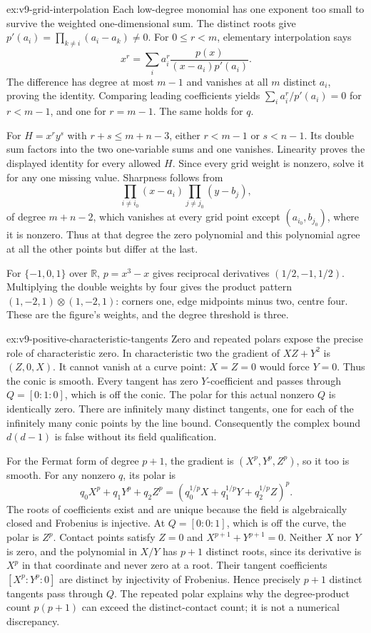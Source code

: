 \begin{solution}{ex:v9-grid-interpolation}
\idea Each low-degree monomial has one exponent too small to survive the weighted one-dimensional sum.
\writeup The distinct roots give $p'(a_i)=\prod_{k\ne i}(a_i-a_k)\ne0$. For $0\le r<m$, elementary interpolation says
\[
x^r=\sum_i a_i^r\frac{p(x)}{(x-a_i)p'(a_i)}.
\]
The difference has degree at most $m-1$ and vanishes at all $m$ distinct $a_i$, proving the identity. Comparing leading coefficients yields $\sum_i a_i^r/p'(a_i)=0$ for $r<m-1$, and one for $r=m-1$. The same holds for $q$.

For $H=x^ry^s$ with $r+s\le m+n-3$, either $r<m-1$ or $s<n-1$. Its double sum factors into the two one-variable sums and one vanishes. Linearity proves the displayed identity for every allowed $H$. Since every grid weight is nonzero, solve it for any one missing value. Sharpness follows from
\[
\prod_{i\ne i_0}(x-a_i)\prod_{j\ne j_0}(y-b_j),
\]
of degree $m+n-2$, which vanishes at every grid point except $(a_{i_0},b_{j_0})$, where it is nonzero. Thus at that degree the zero polynomial and this polynomial agree at all the other points but differ at the last.

For $\{-1,0,1\}$ over $\mathbb R$, $p=x^3-x$ gives reciprocal derivatives $(1/2,-1,1/2)$. Multiplying the double weights by four gives the product pattern $(1,-2,1)\otimes(1,-2,1)$: corners one, edge midpoints minus two, centre four. These are the figure's weights, and the degree threshold is three.
\end{solution}
\begin{solution}{ex:v9-positive-characteristic-tangents}
\idea Zero and repeated polars expose the precise role of characteristic zero.
\writeup In characteristic two the gradient of $XZ+Y^2$ is $(Z,0,X)$. It cannot vanish at a curve point: $X=Z=0$ would force $Y=0$. Thus the conic is smooth. Every tangent has zero $Y$-coefficient and passes through $Q=[0:1:0]$, which is off the conic. The polar for this actual nonzero $Q$ is identically zero. There are infinitely many distinct tangents, one for each of the infinitely many conic points by the line bound. Consequently the complex bound $d(d-1)$ is false without its field qualification.

For the Fermat form of degree $p+1$, the gradient is $(X^p,Y^p,Z^p)$, so it too is smooth. For any nonzero $q$, its polar is
\[
q_0X^p+q_1Y^p+q_2Z^p
=(q_0^{1/p}X+q_1^{1/p}Y+q_2^{1/p}Z)^p.
\]
The roots of coefficients exist and are unique because the field is algebraically closed and Frobenius is injective. At $Q=[0:0:1]$, which is off the curve, the polar is $Z^p$. Contact points satisfy $Z=0$ and $X^{p+1}+Y^{p+1}=0$. Neither $X$ nor $Y$ is zero, and the polynomial in $X/Y$ has $p+1$ distinct roots, since its derivative is $X^p$ in that coordinate and never zero at a root. Their tangent coefficients $[X^p:Y^p:0]$ are distinct by injectivity of Frobenius. Hence precisely $p+1$ distinct tangents pass through $Q$. The repeated polar explains why the degree-product count $p(p+1)$ can exceed the distinct-contact count; it is not a numerical discrepancy.
\end{solution}

